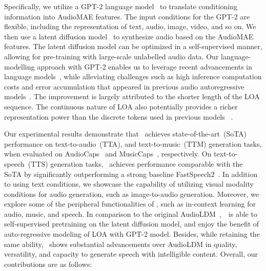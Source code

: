\documentclass[lettersize,journal]{IEEEtran}
\begin{document}
Specifically, we utilize a GPT-2 language model~\cite{radford2019language} to translate conditioning information into AudioMAE features. The input conditions for the GPT-2 are flexible, including the representation of text, audio, image, video, and so on. We then use a latent diffusion model~\cite{rombach2022high-stablediffusion} to synthesize audio based on the AudioMAE features. The latent diffusion model can be optimized in a self-supervised manner, allowing for pre-training with large-scale unlabelled audio data. Our language-modelling approach with GPT-2 enables us to leverage recent advancements in language models~\cite{zhao2023survey}, while alleviating challenges such as high inference computation costs and error accumulation that appeared in previous audio autoregressive models~\cite{zeghidour2021soundstream, agostinelli2023musiclm}. The improvement is largely attributed to the shorter length of the LOA sequence. 
The continuous nature of LOA also potentially provides a richer representation power than the discrete tokens used in previous models ~\cite{lam2023efficient-melody, borsos2023audiolm, agostinelli2023musiclm}.

Our experimental results demonstrate that \vModelName~achieves state-of-the-art~(SoTA) performance on text-to-audio~(TTA), and text-to-music~(TTM) generation tasks, when evaluated on AudioCaps~\cite{kim2019audiocaps} and MusicCaps~\cite{agostinelli2023musiclm}, respectively. On text-to-speech~(TTS) generation tasks, \vModelName~achieves performance comparable with the SoTA by significantly outperforming a strong baseline FastSpeech2~\cite{Fastspeech2}. 
In addition to using text conditions, we showcase the capability of utilizing visual modality conditions for audio generation, such as image-to-audio generation. Moreover, we explore some of the peripheral functionalities of \vModelName, such as in-context learning for audio, music, and speech.
In comparison to the original AudioLDM~\cite{liu2023audioldm},~\vModelName~is able to self-supervised pretraining on the latent diffusion model, and enjoy the benefit of auto-regressive modeling of LOA with GPT-2 model. Besides, while retaining the same ability, \vModelName~shows substantial advancements over AudioLDM in quality, versatility, and capacity to generate speech with intelligible content. 
Overall, our contributions are as follows:
\end{document}
